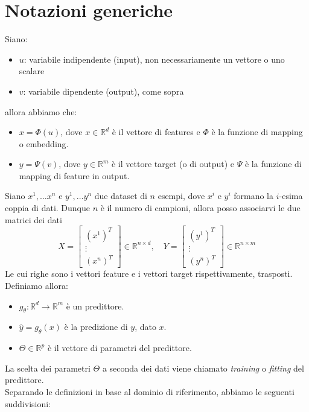 \documentclass{../main.tex}[subfiles]
\begin{document}
\section{Notazioni generiche}
Siano:
\begin{itemize}
	\item $u$: variabile indipendente (input), non necessariamente un vettore o uno scalare
	\item $v$: variabile dipendente (output), come sopra 
\end{itemize}
allora abbiamo che:
\begin{itemize}
	\item $x=\Phi(u)$, dove $x\in \mathbb{R}^d$ è il vettore di features e $\Phi$ è la funzione di mapping o embedding.
	\item $y=\Psi(v)$, dove $y\in \mathbb{R}^m$ è il vettore target (o di output) e $\Psi$ è la funzione di mapping di feature in output.
\end{itemize}
Siano $x^1,\dots x^n$ e $y^1,\dots y^n$ due dataset di $n$ esempi, dove $x^i$ e $y^i$ formano la $i$-esima coppia di dati. Dunque $n$ è il numero di campioni, allora posso associarvi le due matrici dei dati
$$X=\begin{bmatrix}
	(x^1)^T\\ \vdots \\ (x^n)^T
\end{bmatrix}\in \mathbb{R}^{n \times d}, \quad Y=\begin{bmatrix}
	(y^1)^T\\ \vdots \\ (y^n)^T
\end{bmatrix}\in \mathbb{R}^{n \times m}$$
Le cui righe sono i vettori feature e i vettori target rispettivamente, trasposti.\\
Definiamo allora:
\begin{itemize}
	\item $g_\theta: \mathbb{R}^d \to \mathbb{R}^m$ è un predittore. 
	\item $\hat{y}=g_\theta(x)$ è la predizione di $y$, dato $x$.
	\item $\Theta\in\mathbb{R}^p$ è il vettore di parametri del predittore.
\end{itemize}
La scelta dei parametri $\Theta$ a seconda dei dati viene chiamato \textit{training} o \textit{fitting} del predittore. 
\\
Separando le definizioni in base al dominio di riferimento, abbiamo le seguenti suddivisioni:
\end{document}
